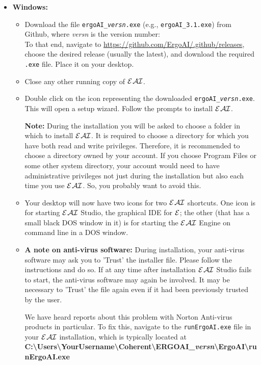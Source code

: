 \documentclass[11pt]{article}
\newcommand{\ERGO}{\mbox{\ensuremath{\cal{E}}\smaller{{\sc{RGO}}}}\xspace}
\newcommand{\ERGOAI}{\mbox{{\ensuremath{\cal{E}}\smaller{{\sc{RGO}}}}\ensuremath{\cal{AI}}}\xspace}
\newcommand{\bs}{\textbackslash}
\begin{document}
\begin{itemize}
\item[] \textbf{Windows:} 
  \begin{itemize}
  \item Download the file \texttt{ergoAI\_\textnormal{\emph{versn}}.exe}
    (e.g., \verb|ergoAI_3.1.exe|) from Github, where
    \emph{versn} is the version number: \\
    To that end, navigate to
    \url{https://github.com/ErgoAI/.github/releases}, 
    choose the desired release (usually the latest), and download the
    required \texttt{.exe} file. 
    Place it on your desktop.
  \item Close any other running copy of \ERGOAI.
  \item Double click on the icon representing the downloaded
    \texttt{ergoAI\_\textnormal{\emph{versn}}.exe}. This will open a setup
    wizard.  Follow the prompts to install \ERGOAI.

    \textbf{Note:} During the installation you will be asked to choose a
    folder in which to install \ERGOAI. It is required to choose a directory
    for which you have both read and write privileges.  Therefore, it is
    recommended to choose a directory owned by your account. If you choose
    Program Files or some other system directory, your account would need
    to have administrative privileges not just during the installation but
    also each time you use \ERGOAI.
    So, you probably want to avoid this.
  \item Your desktop will now have two icons for two \ERGOAI shortcuts. One
    icon is for starting \ERGOAI Studio, the graphical IDE for \ERGO; the
    other (that has a small black DOS window in it) is for starting the
    \ERGOAI Engine on command line in a DOS window.
  \item \textbf{A note on anti-virus software:} During installation, your
    anti-virus software may ask you to 'Trust' the installer file. Please follow
    the instructions and do so.  If at any time after installation \ERGOAI Studio
    fails to start, the anti-virus software may again be involved. It may
    be necessary to 'Trust' the file again even if it had been previously
    trusted by the user.
  
    We have heard reports about this problem with Norton Anti-virus
    products in particular.  To fix this, navigate to the
    \texttt{runErgoAI.exe} 
    file in your \ERGOAI installation, which is typically located at
    \\
    \textbf{C:\bs{}Users\bs{}YourUsername\bs{}Coherent\bs{}ERGOAI\_\textnormal{\emph{versn}}\bs{}ErgoAI\bs{}runErgoAI.exe}


\end{itemize}
\end{itemize}
\end{document}
